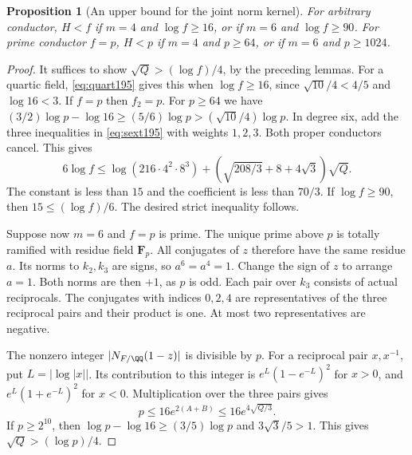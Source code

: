 \documentclass[a4paper,11pt]{article}
\newtheorem{proposition}{Proposition}[section]
\theoremstyle{definition}
\theoremstyle{remark}
\numberwithin{equation}{section}
\begin{document}
\begin{proposition}[An upper bound for the joint norm kernel]
\label{prop:conduct195}
For arbitrary conductor, \(H<f\) if \(m=4\) and \(\log f\ge16\),
or if \(m=6\) and \(\log f\ge90\). For prime conductor \(f=p\),
\(H<p\) if \(m=4\) and \(p\ge64\), or if \(m=6\) and \(p\ge1024\).
\end{proposition}
\begin{proof}
It suffices to show \(\sqrt Q>(\log f)/4\), by the preceding
lemmas. For a quartic field, \eqref{eq:quart195} gives this
when \(\log f\ge16\), since \(\sqrt{10}/4<4/5\) and \(\log16<3\).
If \(f=p\) then \(f_2=p\). For \(p\ge64\) we have
\((3/2)\log p-\log16\ge (5/6)\log p>(\sqrt{10}/4)\log p\).
In degree six, add the three inequalities in \eqref{eq:sext195}
with weights \(1,2,3\). Both proper conductors cancel. This gives
\[
 6\log f\le \log(216\cdot4^2\cdot8^3)
               +(\sqrt{208/3}+8+4\sqrt3)\sqrt Q .
\]
The constant is less than \(15\) and the coefficient is less
than \(70/3\). If \(\log f\ge90\), then \(15\le(\log f)/6\).
The desired strict inequality follows.

Suppose now \(m=6\) and \(f=p\) is prime. The unique prime
above \(p\) is totally ramified with residue field \(\mathbf F_p\).
All conjugates of \(z\) therefore have the same residue \(a\).
Its norms to \(k_2,k_3\) are signs, so \(a^6=a^4=1\). Change
the sign of \(z\) to arrange \(a=1\). Both norms are then
\(+1\), as \(p\) is odd. Each pair over \(k_3\) consists of
actual reciprocals. The conjugates with indices \(0,2,4\) are
representatives of the three reciprocal pairs and their product
is one. At most two representatives are negative.

The nonzero integer \(|N_{F/\QQ}(1-z)|\) is divisible by \(p\).
For a reciprocal pair \(x,x^{-1}\), put \(L=|\log|x||\).
Its contribution to this integer is \(e^L(1-e^{-L})^2\) for
\(x>0\), and \(e^L(1+e^{-L})^2\) for \(x<0\). Multiplication
over the three pairs gives
\[
    p\le16e^{2(A+B)}\le16e^{4\sqrt{Q/3}}.
\]
If \(p\ge2^{10}\), then \(\log p-\log16\ge(3/5)\log p\)
and \(3\sqrt3/5>1\). This gives \(\sqrt Q>(\log p)/4\).
\end{proof}
\end{document}
